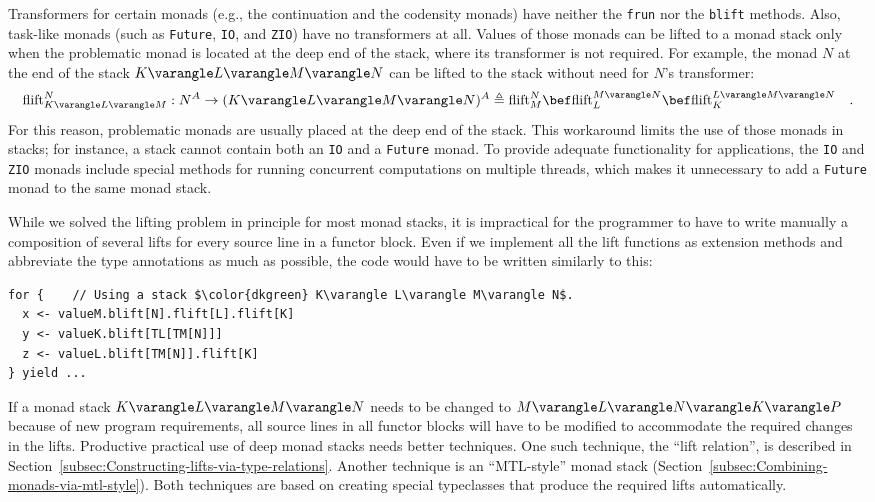 Transformers for certain monads (e.g., the continuation and the codensity
monads) have neither the \lstinline!frun! nor the \lstinline!blift!
methods. Also, task-like monads (such as \lstinline!Future!, \lstinline!IO!,
and \lstinline!ZIO!) have no transformers at all. Values of those
monads can be lifted to a monad stack only when the problematic monad
is located at the deep end of the stack, where its transformer is
not required. For example, the monad $N$ at the end of the stack
$K\varangle L\varangle M\varangle N$ can be lifted to the stack without
need for $N$\textsf{'}s transformer:
\[
\text{flift}_{K\varangle L\varangle M}^{N}:N^{A}\rightarrow(K\varangle L\varangle M\varangle N)^{A}\triangleq\text{flift}_{M}^{N}\bef\text{flift}_{L}^{M\varangle N}\bef\text{flift}_{K}^{L\varangle M\varangle N}\quad.
\]
For this reason, problematic monads are usually placed at the deep
end of the stack. This workaround limits the use of those monads in
stacks; for instance, a stack cannot contain both an \lstinline!IO!
and a \lstinline!Future! monad. To provide adequate functionality
for applications, the \lstinline!IO! and \lstinline!ZIO! monads
include special methods for running concurrent computations on multiple
threads, which makes it unnecessary to add a \lstinline!Future! monad
to the same monad stack.

While we solved the lifting problem in principle for most monad stacks,
it is impractical for the programmer to have to write manually a composition
of several lifts for every source line in a functor block. Even if
we implement all the lift functions as extension methods and abbreviate
the type annotations as much as possible, the code would have to be
written similarly to this:
\begin{lstlisting}[mathescape=true]
for {    // Using a stack $\color{dkgreen} K\varangle L\varangle M\varangle N$.
  x <- valueM.blift[N].flift[L].flift[K]
  y <- valueK.blift[TL[TM[N]]]
  z <- valueL.blift[TM[N]].flift[K]
} yield ...
\end{lstlisting}
If a monad stack $K\varangle L\varangle M\varangle N$ needs to be
changed to $M\varangle L\varangle N\varangle K\varangle P$ because
of new program requirements, all source lines in all functor blocks
will have to be modified to accommodate the required changes in the
lifts. Productive practical use of deep monad stacks needs better
techniques. One such technique, the \textsf{``}lift relation\textsf{''}, is described
in Section~\ref{subsec:Constructing-lifts-via-type-relations}. Another
technique is an \textsf{``}MTL-style\textsf{''} monad stack (Section~\ref{subsec:Combining-monads-via-mtl-style}).
Both techniques are based on creating special typeclasses that produce
the required lifts automatically.

